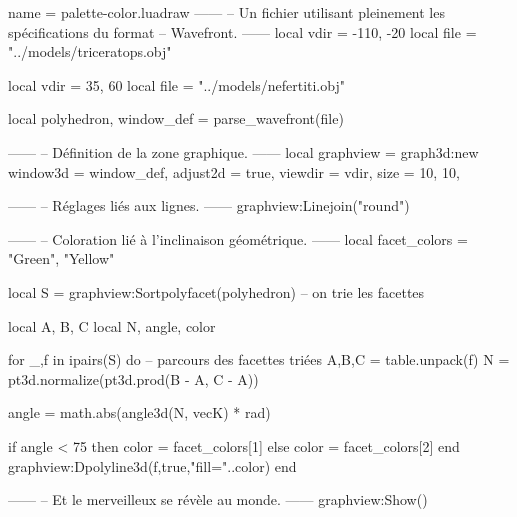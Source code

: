 \documentclass{standalone}
\begin{document}
\begin{luadraw}{name = palette-color.luadraw}
------
-- Un fichier utilisant pleinement les spécifications du format
-- Wavefront.
------
local vdir = {-110, -20}
local file = "../models/triceratops.obj"

local vdir = {35, 60}
local file = "../models/nefertiti.obj"

local polyhedron, window_def = parse_wavefront(file)

------
-- Définition de la zone graphique.
------
local graphview = graph3d:new{
  window3d = window_def,
  adjust2d = true,
  viewdir  = vdir,
  size     = {10, 10},
}

------
-- Réglages liés aux lignes.
------
graphview:Linejoin("round")

------
-- Coloration lié à l'inclinaison géométrique.
------
local facet_colors = {"Green", "Yellow"}

local S = graphview:Sortpolyfacet(polyhedron) -- on trie les facettes

local A, B, C
local N, angle, color

for _,f in ipairs(S) do  -- parcours des facettes triées
  A,B,C = table.unpack(f)
  N = pt3d.normalize(pt3d.prod(B - A, C - A))
  
  angle = math.abs(angle3d(N, vecK) * rad)
  
  
  if angle < 75 then
    color = facet_colors[1]
  else
    color = facet_colors[2]
  end
  graphview:Dpolyline3d(f,true,"fill="..color)
end

------
-- Et le merveilleux se révèle au monde.
------
graphview:Show()

\end{luadraw}
\end{document}
